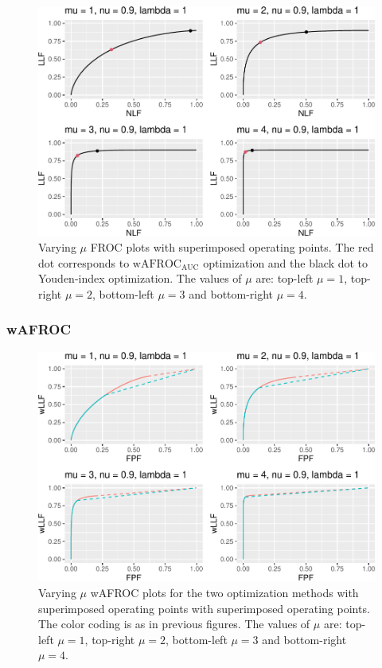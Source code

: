 \documentclass[
]{book}
\begin{document}
\begin{figure}
\centering
\includegraphics{21-optim-op-point_files/figure-latex/optim-op-point-vary-mu-froc-1.pdf}
\caption{\label{fig:optim-op-point-vary-mu-froc}Varying \(\mu\) FROC plots with superimposed operating points. The red dot corresponds to \(\text{wAFROC}_\text{AUC}\) optimization and the black dot to Youden-index optimization. The values of \(\mu\) are: top-left \(\mu = 1\), top-right \(\mu = 2\), bottom-left \(\mu = 3\) and bottom-right \(\mu = 4\).}
\end{figure}

\hypertarget{wafroc-4}{%
\subsubsection{wAFROC}\label{wafroc-4}}

\begin{figure}
\centering
\includegraphics{21-optim-op-point_files/figure-latex/optim-op-point-vary-mu-wafroc-1.pdf}
\caption{\label{fig:optim-op-point-vary-mu-wafroc}Varying \(\mu\) wAFROC plots for the two optimization methods with superimposed operating points with superimposed operating points. The color coding is as in previous figures. The values of \(\mu\) are: top-left \(\mu = 1\), top-right \(\mu = 2\), bottom-left \(\mu = 3\) and bottom-right \(\mu = 4\).}
\end{figure}
\end{document}
